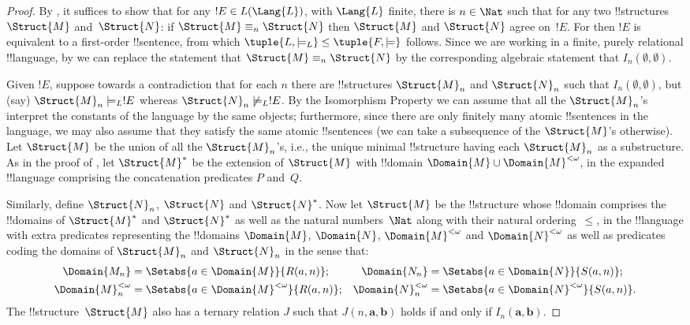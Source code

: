 \documentclass[../../../include/open-logic-section]{subfiles}
\begin{document}
\begin{proof}
By , it suffices to show that for any $!E
\in L(\Lang{L})$, with $\Lang{L}$ finite, there is $n \in \Nat$
such that for any two !!{structure}s $\Struct{M}$ and~$\Struct{N}$: if
$\Struct{M} \equiv_n \Struct{N}$ then $\Struct{M}$ and $\Struct{N}$
agree on~$!E$. For then $!E$ is equivalent to a first-order
!!{sentence}, from which $\tuple{L, \models_L} \le \tuple{F, \models}$
follows. Since we are working in a finite, purely relational
!!{language}, by  we can replace the statement
that $\Struct{M} \equiv_n \Struct{N}$ by the corresponding algebraic
statement that $I_n(\emptyset,\emptyset)$.

Given $!E$, suppose towards a contradiction that for each $n$ there
are !!{structure}s $\Struct{M}_n$ and $\Struct{N}_n$ such that
$I_n(\emptyset, \emptyset)$, but (say) $\Struct{M}_n \models_L !E$
whereas $\Struct{N}_n \not\models_L !E$. By the Isomorphism Property
we can assume that all the $\Struct{M}_n$'s interpret the constants of
the language by the same objects; furthermore, since there are only
finitely many atomic !!{sentence}s in the language, we may also assume
that they satisfy the same atomic !!{sentence}s (we can take a
subsequence of the $\Struct{M}$'s otherwise). Let $\Struct{M}$ be the
union of all the $\Struct{M}_n$'s, i.e., the unique minimal
!!{structure} having each $\Struct{M}_n$ as a substructure.  As in the
proof of , let $\Struct{M}^*$ be the
extension of $\Struct{M}$ with !!{domain} $\Domain{M} \cup
\Domain{M}^{<\omega}$, in the expanded !!{language} comprising the
concatenation predicates $P$ and~$Q$.

Similarly, define $\Struct{N}_n$, $\Struct{N}$ and $\Struct{N}^*$. Now
let $\Struct{M}$ be the !!{structure} whose !!{domain} comprises the
!!{domain}s of $\Struct{M}^*$ and $\Struct{N}^*$ as well as the natural
numbers~$\Nat$ along with their natural ordering~$\le$, in the
!!{language} with extra predicates representing the !!{domain}s
$\Domain{M}$, $\Domain{N}$, $\Domain{M}^{<\omega}$ and
$\Domain{N}^{<\omega}$ as well as predicates coding the domains of
$\Struct{M}_n$ and $\Struct{N}_n$ in the sense that:
\begin{align*}
  \Domain{M_n} & = \Setabs{a \in \Domain{M}}{R(a, n)}; & 
  \Domain{N_n} & = \Setabs{a \in \Domain{N}}{S(a,n)}; \\
  \Domain{M}^{<\omega}_n & = \Setabs{a \in \Domain{M}^{<\omega}}{R(a,n)}; &
  \Domain{N}^{<\omega}_n & = \Setabs{a \in \Domain{N}^{<\omega}}{S(a,n)}. 
\end{align*}
The !!{structure}~$\Struct{M}$ also has a ternary relation $J$ such
that $J(n, \mathbf{a}, \mathbf{b})$ holds if and only if
$I_n(\mathbf{a}, \mathbf{b})$.


\end{proof}
\end{document}
